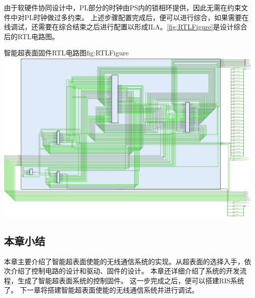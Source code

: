 \documentclass[supercite]{HustGraduPaper}
\begin{document}




由于软硬件协同设计中，PL部分的时钟由PS内的锁相环提供，因此无需在约束文件中对PL时钟做过多约束。
上述步骤配置完成后，便可以进行综合，如果需要在线调试，还需要在综合结束之后进行配置以形成ILA。\autoref{fig:RTLFigure}是设计综合后的RTL电路图。

\begin{generalfig}[htb]{智能超表面固件RTL电路图}{fig:RTLFigure}
	\includegraphics[width=\linewidth]{Figures/RTLFigure.pdf}
\end{generalfig}

\subsection{本章小结}

本章主要介绍了智能超表面使能的无线通信系统的实现。从超表面的选择入手，依次介绍了控制电路的设计和驱动、固件的设计。
本章还详细介绍了系统的开发流程，生成了智能超表面系统的控制固件。
这一步完成之后，便可以搭建RIS系统了。
下一章将搭建智能超表面使能的无线通信系统并进行调试。
\end{document}
